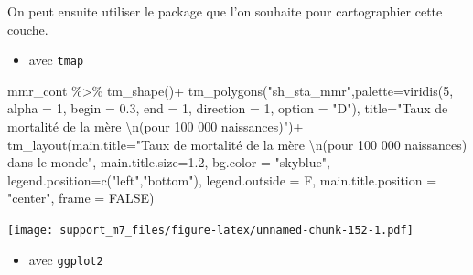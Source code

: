 \documentclass[
]{book}
\newenvironment{Shaded}{\begin{snugshade}}{\end{snugshade}}
\newcommand{\AttributeTok}[1]{\textcolor[rgb]{0.77,0.63,0.00}{#1}}
\newcommand{\ConstantTok}[1]{\textcolor[rgb]{0.00,0.00,0.00}{#1}}
\newcommand{\DecValTok}[1]{\textcolor[rgb]{0.00,0.00,0.81}{#1}}
\newcommand{\FloatTok}[1]{\textcolor[rgb]{0.00,0.00,0.81}{#1}}
\newcommand{\FunctionTok}[1]{\textcolor[rgb]{0.00,0.00,0.00}{#1}}
\newcommand{\NormalTok}[1]{#1}
\newcommand{\SpecialCharTok}[1]{\textcolor[rgb]{0.00,0.00,0.00}{#1}}
\newcommand{\StringTok}[1]{\textcolor[rgb]{0.31,0.60,0.02}{#1}}
\providecommand{\tightlist}{%
  \setlength{\itemsep}{0pt}\setlength{\parskip}{0pt}}
\begin{document}
On peut ensuite utiliser le package que l'on souhaite pour cartographier cette couche.

\begin{itemize}
\tightlist
\item
  avec \texttt{tmap}
\end{itemize}

\begin{Shaded}
\begin{Highlighting}[]
\NormalTok{mmr\_cont }\SpecialCharTok{\%\textgreater{}\%} 
  \FunctionTok{tm\_shape}\NormalTok{()}\SpecialCharTok{+}
  \FunctionTok{tm\_polygons}\NormalTok{(}\StringTok{"sh\_sta\_mmr"}\NormalTok{,}\AttributeTok{palette=}\FunctionTok{viridis}\NormalTok{(}\DecValTok{5}\NormalTok{, }\AttributeTok{alpha =} \DecValTok{1}\NormalTok{, }\AttributeTok{begin =} \FloatTok{0.3}\NormalTok{, }\AttributeTok{end =} \DecValTok{1}\NormalTok{, }\AttributeTok{direction =} \DecValTok{1}\NormalTok{, }\AttributeTok{option =} \StringTok{"D"}\NormalTok{),}
              \AttributeTok{title=}\StringTok{"Taux de mortalité de la mère }\SpecialCharTok{\textbackslash{}n}\StringTok{(pour 100 000 naissances)"}\NormalTok{)}\SpecialCharTok{+}
  \FunctionTok{tm\_layout}\NormalTok{(}\AttributeTok{main.title=}\StringTok{"Taux de mortalité de la mère }\SpecialCharTok{\textbackslash{}n}\StringTok{(pour 100 000 naissances) dans le monde"}\NormalTok{,}
            \AttributeTok{main.title.size=}\FloatTok{1.2}\NormalTok{,}
            \AttributeTok{bg.color =} \StringTok{"skyblue"}\NormalTok{,}
            \AttributeTok{legend.position=}\FunctionTok{c}\NormalTok{(}\StringTok{"left"}\NormalTok{,}\StringTok{"bottom"}\NormalTok{),}
            \AttributeTok{legend.outside =}\NormalTok{ F,}
            \AttributeTok{main.title.position =} \StringTok{"center"}\NormalTok{,}
            \AttributeTok{frame =} \ConstantTok{FALSE}\NormalTok{)}
\end{Highlighting}
\end{Shaded}

\texttt{[image: support\_m7\_files/figure-latex/unnamed-chunk-152-1.pdf]}

\begin{itemize}
\tightlist
\item
  avec \texttt{ggplot2}
\end{itemize}
\end{document}
